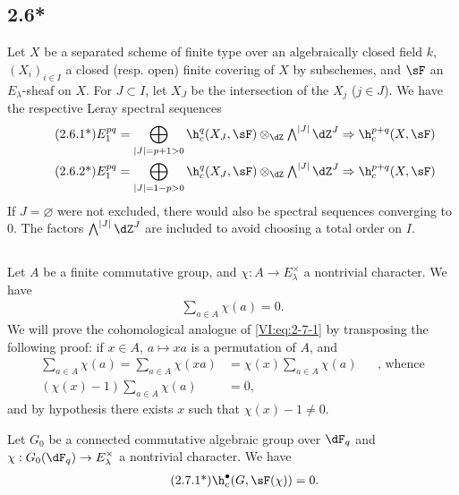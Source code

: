 \documentclass[oneside]{book}
\begin{document}
\subsection*{2.6*}\label{VI:2-6*}

Let $X$ be a separated scheme of finite type over an algebraically closed field $k$, 
$(X_i)_{i\in I}$ a closed (resp. open) finite covering of $X$ by 
subschemes, and $\sF$ an $E_\lambda$-sheaf on $X$. For $J\subset I$, 
let $X_J$ be the intersection of the $X_j$ ($j\in J$). We have the respective 
Leray spectral sequences 
\begin{align*}\tag{2.6.1*}\label{VI:eq:2-6-1*}
  E_1^{p q} &= \bigoplus_{|J|=p+1>0} \h_c^q(X_J,\sF) \otimes_\dZ \textstyle\bigwedge^{|J|} \dZ^J \Rightarrow \h_c^{p+q}(X,\sF) \\ 
  \tag{2.6.2*}\label{VI:eq:2-6-2*}
  E_1^{p q} &= \bigoplus_{|J|=1-p>0} \h_c^q(X_J,\sF) \otimes_\dZ \textstyle\bigwedge^{|J|} \dZ^J \Rightarrow \h_c^{p+q}(X,\sF)
\end{align*}
If $J=\varnothing$ were not excluded, there would also be spectral 
sequences converging to $0$. The factors $\bigwedge^{|J|} \dZ^J$ are included 
to avoid choosing a total order on $I$. 





\subsection{}\label{VI:2-7}

Let $A$ be a finite commutative group, and $\chi:A \to E_\lambda^\times$ a 
nontrivial character. We have 
\begin{align*}\tag{2.7.1}\label{VI:eq:2-7-1}
  \sum_{a\in A} \chi(a) = 0 \text{.}
\end{align*}
We will prove the cohomological analogue of \eqref{VI:eq:2-7-1} by transposing 
the following proof: if $x\in A$, $a\mapsto x a$ is a permutation of $A$, and 
\begin{align*}
  \sum_{a\in A}\chi(a) = \sum_{a\in A} \chi(x a) &= \chi(x) \sum_{a\in A} \chi(a) && \text{, whence} \\
  (\chi(x)-1)\sum_{a\in A}\chi(a) &= 0 \text{,}
\end{align*}
and by hypothesis there exists $x$ such that $\chi(x)-1\ne 0$. 





\begin{theorem*}[2.7*]\label{VI:2-7*}
Let $G_0$ be a connected commutative algebraic group over $\dF_q$ and 
$\chi:G_0(\dF_q) \to E_\lambda^\times$ a nontrivial character. We have 
\begin{align*}\tag{2.7.1*}\label{VI:eq:2-7-1*}
  \h_c^\bullet(G,\sF(\chi)) = 0 \text{.}
\end{align*}
\end{theorem*}
\end{document}
